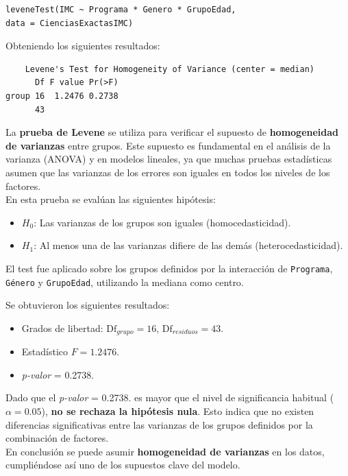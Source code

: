 \documentclass{rapport}
\begin{document}
\begin{lstlisting}[style=rstyle]
leveneTest(IMC ~ Programa * Genero * GrupoEdad, 
data = CienciasExactasIMC)
\end{lstlisting}

Obteniendo los siguientes resultados:

\begin{verbatim}
    Levene's Test for Homogeneity of Variance (center = median)
      Df F value Pr(>F)
group 16  1.2476 0.2738
      43 
\end{verbatim}

La \textbf{prueba de Levene} se utiliza para verificar el supuesto de \textbf{homogeneidad de varianzas} entre grupos. Este supuesto es fundamental en el análisis de la varianza (ANOVA) y en modelos lineales, ya que muchas pruebas estadísticas asumen que las varianzas de los errores son iguales en todos los niveles de los factores.\\

En esta prueba se evalúan las siguientes hipótesis:

\begin{itemize}
    \item \( H_0 \): Las varianzas de los grupos son iguales (homocedasticidad).
    \item \( H_1 \): Al menos una de las varianzas difiere de las demás (heterocedasticidad).
\end{itemize}

El test fue aplicado sobre los grupos definidos por la interacción de \texttt{Programa}, \texttt{Género} y \texttt{GrupoEdad}, utilizando la mediana como centro.

Se obtuvieron los siguientes resultados:
\begin{itemize}
    \item Grados de libertad: \( \text{Df}_{grupo} = 16 \), \( \text{Df}_{residuos} = 43 \).
    \item Estadístico \( F = 1.2476 \).
    \item \textit{p-valor} = 0.2738.
\end{itemize}

Dado que el \textit{p-valor} = 0.2738. es mayor que el nivel de significancia habitual (\( \alpha = 0.05 \)), \textbf{no se rechaza la hipótesis nula}. Esto indica que no existen diferencias significativas entre las varianzas de los grupos definidos por la combinación de factores.\\

En conclusión se puede asumir \textbf{homogeneidad de varianzas} en los datos, cumpliéndose así uno de los supuestos clave del modelo.
\end{document}
